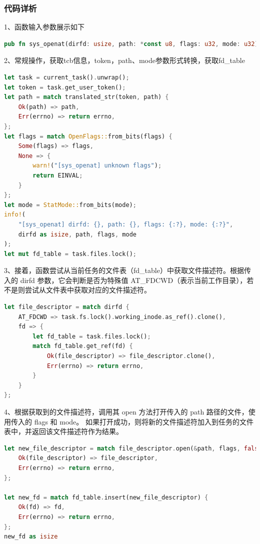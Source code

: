 \subsubsection{代码详析}
1、函数输入参数展示如下
\begin{lstlisting}[language={Rust}, 
    caption={openat的参数与返回值}]
pub fn sys_openat(dirfd: usize, path: *const u8, flags: u32, mode: u32) -> isize
\end{lstlisting}
2、常规操作，获取tcb信息，token，path、mode参数形式转换，获取fd_table
\begin{lstlisting}[language={Rust}, 
    caption={openat 常规操作，获取tcb信息、token、path参数形式转换}]
let task = current_task().unwrap();
let token = task.get_user_token();
let path = match translated_str(token, path) {
    Ok(path) => path,
    Err(errno) => return errno,
};
let flags = match OpenFlags::from_bits(flags) {
    Some(flags) => flags,
    None => {
        warn!("[sys_openat] unknown flags");
        return EINVAL;
    }
};
let mode = StatMode::from_bits(mode);
info!(
    "[sys_openat] dirfd: {}, path: {}, flags: {:?}, mode: {:?}",
    dirfd as isize, path, flags, mode
);
let mut fd_table = task.files.lock();
\end{lstlisting}
3、接着，函数尝试从当前任务的文件表（fd_table）中获取文件描述符。根据传入的 dirfd 参数，它会判断是否为特殊值 AT_FDCWD（表示当前工作目录），若不是则尝试从文件表中获取对应的文件描述符。
\begin{lstlisting}[language={Rust}, 
    caption={openat获取目录文件描述符}]
let file_descriptor = match dirfd {
    AT_FDCWD => task.fs.lock().working_inode.as_ref().clone(),
    fd => {
        let fd_table = task.files.lock();
        match fd_table.get_ref(fd) {
            Ok(file_descriptor) => file_descriptor.clone(),
            Err(errno) => return errno,
        }
    }
};
\end{lstlisting}
4、根据获取到的文件描述符，调用其 open 方法打开传入的 path 路径的文件，使用传入的 flags 和 mode。
如果打开成功，则将新的文件描述符加入到任务的文件表中，并返回该文件描述符作为结果。
\begin{lstlisting}[language={Rust}, 
    caption={openat-打开文件，返回值设置为文件描述符的}]
let new_file_descriptor = match file_descriptor.open(&path, flags, false) {
    Ok(file_descriptor) => file_descriptor,
    Err(errno) => return errno,
};

let new_fd = match fd_table.insert(new_file_descriptor) {
    Ok(fd) => fd,
    Err(errno) => return errno,
};
new_fd as isize
\end{lstlisting}
